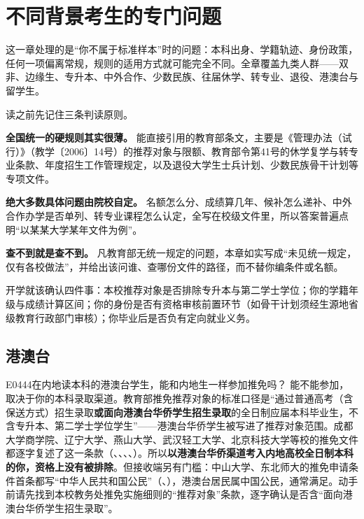 \chapter{不同背景考生的专门问题}
\label{ch16}
\begin{keybox}
这一章处理的是“你不属于标准样本”时的问题：本科出身、学籍轨迹、身份政策，任何一项偏离常规，规则的适用方式就可能完全不同。全章覆盖九类人群——双非、边缘生、专升本、中外合作、少数民族、往届休学、转专业、退役、港澳台与留学生。

读之前先记住三条判读原则。

\textbf{全国统一的硬规则其实很薄。} 能直接引用的教育部条文，主要是《管理办法（试行）》（教学〔2006〕14号）的推荐对象与限额、教育部令第41号的休学复学与转专业条款、年度招生工作管理规定，以及退役大学生士兵计划、少数民族骨干计划等专项文件。

\textbf{绝大多数具体问题由院校自定。} 名额怎么分、成绩算几年、候补怎么递补、中外合作办学是否单列、转专业课程怎么认定，全写在校级文件里，所以答案普遍点明“以某某大学某年文件为例”。

\textbf{查不到就是查不到。} 凡教育部无统一规定的问题，本章如实写成“未见统一规定，仅有各校做法”，并给出该问谁、查哪份文件的路径，而不替你编条件或名额。

开学就该确认四件事：本校推荐对象是否排除专升本与第二学士学位；你的学籍年级与成绩计算区间；你的身份是否有资格审核前置环节（如骨干计划须经生源地省级教育行政部门审核）；你毕业后是否负有定向就业义务。
\end{keybox}

\section{港澳台}
\begin{qa}{E0444}{在内地读本科的港澳台学生，能和内地生一样参加推免吗？}
能不能参加，取决于你的本科录取渠道。教育部推免推荐对象的标准口径是“通过普通高考（含保送方式）招生录取\textbf{或面向港澳台华侨学生招生录取}的全日制应届本科毕业生，不含专升本、第二学士学位学生”——港澳台华侨学生被写进了推荐对象范围。成都大学商学院、辽宁大学、燕山大学、武汉轻工大学、北京科技大学等校的推免文件都逐字复述了这一条款（、、、、）。所以\textbf{以港澳台华侨渠道考入内地高校全日制本科的你，资格上没有被排除}。但接收端另有门槛：中山大学、东北师大的推免申请条件首条都写“中华人民共和国公民”（、），港澳台居民属中国公民，通常满足。动手前请先找到本校教务处推免实施细则的“推荐对象”条款，逐字确认是否含“面向港澳台华侨学生招生录取”。
\end{qa}

